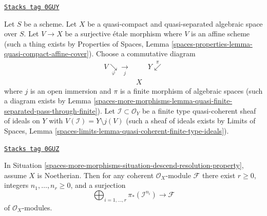 \begin{definition}
\label{spaces-more-morphisms-situation-descend-resolution-property}
\href{https://stacks.math.columbia.edu/tag/0GUY}{\texttt{Stacks tag 0GUY}}

Let $S$ be a scheme. Let $X$ be a quasi-compact and quasi-separated
algebraic space over $S$. Let $V \to X$ be a surjective \'etale
morphism where $V$ is an affine scheme (such a thing exists by
Properties of Spaces, Lemma
\ref{spaces-properties-lemma-quasi-compact-affine-cover}).
Choose a commutative diagram
$$
\begin{array}{ccc}V \underset{\varphi}{\searrow}\underset{j}{\longrightarrow} &  & Y \overset{\pi}{\swarrow} \\  & X & \end{array}
$$
where $j$ is an open immersion and $\pi$ is a finite morphism
of algebraic spaces (such a diagram exists by
Lemma \ref{spaces-more-morphisms-lemma-quasi-finite-separated-pass-through-finite}).
Let $\mathcal{I} \subset \mathcal{O}_Y$ be a finite type
quasi-coherent sheaf of ideals on $Y$ with
$V(\mathcal{I}) = Y \setminus j(V)$ (such a sheaf of ideals exists
by Limits of Spaces, Lemma
\ref{spaces-limits-lemma-quasi-coherent-finite-type-ideals}).
\end{definition}

\begin{lemma}
\label{spaces-more-morphisms-lemma-surjection-in-Noetherian-case}
\href{https://stacks.math.columbia.edu/tag/0GUZ}{\texttt{Stacks tag 0GUZ}}

In Situation \ref{spaces-more-morphisms-situation-descend-resolution-property}, assume
$X$ is Noetherian. Then for any coherent $\mathcal{O}_X$-module
$\mathcal{F}$ there exist $r \geq 0$,
integers $n_1, \ldots, n_r \geq 0$, and a surjection
$$
\bigoplus\nolimits_{i = 1, \ldots, r} \pi_*(\mathcal{I}^{n_i})
\longrightarrow \mathcal{F}
$$
of $\mathcal{O}_X$-modules.
\end{lemma}

